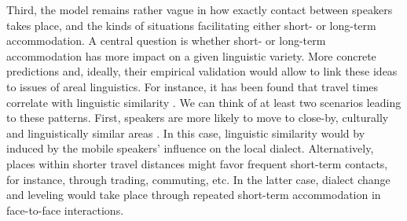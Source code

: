 \documentclass[output=paper,
modfonts
]{langscibook}
\begin{document}
Third, the model remains rather vague in how exactly contact between speakers takes place, and the kinds of situations facilitating either short- or long-term accommodation. A central question is whether short- or long-term accommodation has more impact on a given linguistic variety. More concrete predictions and, ideally, their empirical validation would allow to link these ideas to issues of areal linguistics. %
% 
% 
% 
% 
% 
For instance, it has been found that travel times correlate with linguistic similarity \citep{jeszenszky_exploring_2017}.
% 
% 
We can think of at least two scenarios leading to these patterns. First, speakers are more likely to move to close-by, culturally and linguistically similar areas \citep[e.g.][]{falck_cultural_2016}. In this case, linguistic similarity would by induced by the mobile speakers' influence on the local dialect. Alternatively, places within shorter travel distances might favor frequent short-term contacts, for instance, through trading, commuting, etc. In the latter case, dialect change and leveling would take place through repeated short-term accommodation in face-to-face interactions.
\end{document}
